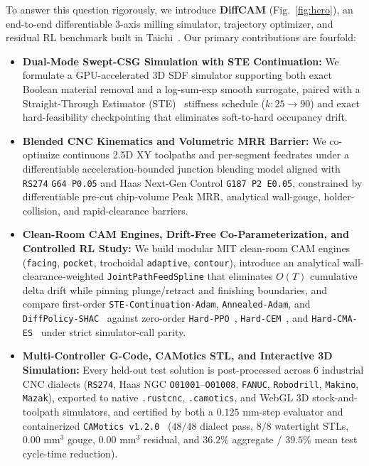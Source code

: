 \documentclass[conference]{IEEEtran}
\begin{document}
To answer this question rigorously, we introduce \textbf{DiffCAM} (Fig.~\ref{fig:hero}), an end-to-end differentiable 3-axis milling simulator, trajectory optimizer, and residual RL benchmark built in Taichi~\cite{hu2020difftaichi}. Our primary contributions are fourfold:
\begin{itemize}
  \item \textbf{Dual-Mode Swept-CSG Simulation with STE Continuation:} We formulate a GPU-accelerated 3D SDF simulator supporting both exact Boolean material removal and a log-sum-exp smooth surrogate, paired with a Straight-Through Estimator (STE)~\cite{bengio2013estimating} stiffness schedule ($k: 25 \to 90$) and exact hard-feasibility checkpointing that eliminates soft-to-hard occupancy drift.
  \item \textbf{Blended CNC Kinematics and Volumetric MRR Barrier:} We co-optimize continuous 2.5D XY toolpaths and per-segment feedrates under a differentiable acceleration-bounded junction blending model aligned with \texttt{RS274} \texttt{G64 P0.05} and Haas Next-Gen Control \texttt{G187 P2 E0.05}, constrained by differentiable pre-cut chip-volume Peak MRR, analytical wall-gouge, holder-collision, and rapid-clearance barriers.
  \item \textbf{Clean-Room CAM Engines, Drift-Free Co-Parameterization, and Controlled RL Study:} We build modular MIT clean-room CAM engines (\texttt{facing}, \texttt{pocket}, trochoidal \texttt{adaptive}, \texttt{contour}), introduce an analytical wall-clearance-weighted \texttt{JointPathFeedSpline} that eliminates $O(T)$ cumulative delta drift while pinning plunge/retract and finishing boundaries, and compare first-order \texttt{STE-Continuation-Adam}, \texttt{Annealed-Adam}, and \texttt{DiffPolicy-SHAC}~\cite{xu2022accelerated} against zero-order \texttt{Hard-PPO}~\cite{schulman2017proximal}, \texttt{Hard-CEM}~\cite{rubinstein2004cem}, and \texttt{Hard-CMA-ES}~\cite{hansen2001cmaes} under strict simulator-call parity.
  \item \textbf{Multi-Controller G-Code, CAMotics STL, and Interactive 3D Simulation:} Every held-out test solution is post-processed across 6 industrial CNC dialects (\texttt{RS274}, Haas NGC \texttt{O01001}--\texttt{O01008}, \texttt{FANUC}, \texttt{Robodrill}, \texttt{Makino}, \texttt{Mazak}), exported to native \texttt{.rustcnc}, \texttt{.camotics}, and WebGL 3D stock-and-toolpath simulators, and certified by both a $0.125\text{ mm}$-step evaluator and containerized \texttt{CAMotics v1.2.0}~\cite{coffland2021camotics} ($48/48$ dialect pass, $8/8$ watertight STLs, $0.00\text{ mm}^3$ gouge, $0.00\text{ mm}^3$ residual, and $36.2\%$ aggregate / $39.5\%$ mean test cycle-time reduction).
\end{itemize}
\end{document}
